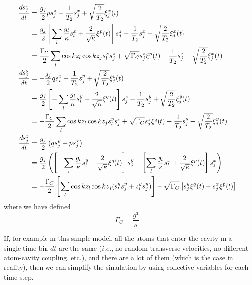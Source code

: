 \documentclass{article}
\newcommand{\gc}{\Gamma_C}
\begin{document}
\begin{align}
    \label{cNumber_qle_beamLaser_xyz}
    \notag \frac{d s_j^x}{dt} &= \frac{g_j}{2}ps^z_j-\frac{1}{T_2}s_j^x+\sqrt{\frac{2}{T_2}}\xi_j^x(t)\\
    \notag &=\frac{g_j}{2}\left[\sum_l\frac{g_l}{\kappa}s_l^x+\frac{2}{\sqrt{\kappa}}\xi^p(t)\right]s^z_j-\frac{1}{T_2}s_j^x+\sqrt{\frac{2}{T_2}}\xi_j^x(t)\\
          &=\frac{\gc}{2}\sum_l \cos{kz_l}\cos{kz_j} s_l^x s^z_j+\sqrt{\gc}s^z_j\xi^p(t)-\frac{1}{T_2}s_j^x+\sqrt{\frac{2}{T_2}}\xi_j^x(t)\\
    \notag \frac{d s_j^y}{dt} &= -\frac{g_j}{2}qs^z_i-\frac{1}{T_2}s_j^y+\sqrt{\frac{2}{T_2}}\xi_j^y(t)\\
    \notag&=\frac{g_j}{2}\left[-\sum_l\frac{g_l}{\kappa}s_l^y-\frac{2}{\sqrt{\kappa}}\xi^q(t)\right]s^z_j-\frac{1}{T_2}s_j^y+\sqrt{\frac{2}{T_2}}\xi_j^y(t)\\
          &=-\frac{\gc}{2}\sum_l \cos{kz_l}\cos{kz_j} s_l^y s^z_j+\sqrt{\gc}s^z_j\xi^q(t)-\frac{1}{T_2}s_j^y+\sqrt{\frac{2}{T_2}}\xi_j^y(t)\\
    \notag \frac{d s_j^z}{dt} &= \frac{g_j}{2}\left(qs^y_j-ps_j^x\right)\\
    \notag     &=\frac{g_j}{2}\left(\left[-\sum_l\frac{g_l}{\kappa}s_l^y-\frac{2}{\sqrt{\kappa}}\xi^q(t)\right] s^y_j-\left[\sum_l\frac{g_l}{\kappa}s_l^x+\frac{2}{\sqrt{\kappa}}\xi^p(t)\right]s_j^x\right)\\
    &= -\frac{\gc}{2}\left[\sum_l \cos{kz_l}\cos{kz_j} (s_l^y s^y_j+s_l^y s^y_j)\right]-\sqrt{\gc}\left[s^y_j\xi^q(t)+s^x_j\xi^p(t)\right]
\end{align}
where we have defined 
\begin{equation}
    \gc = \frac{g^2}{\kappa}
\end{equation}


If, for example in this simple model, all the atoms that enter the cavity in a single time bin $dt$ are the same ($i.e.$, no random transverse velocities, no different atom-cavity coupling, etc.), and there are a lot of them (which is the case in reality), then we can simplify the simulation by using collective variables for each time step.
\end{document}
